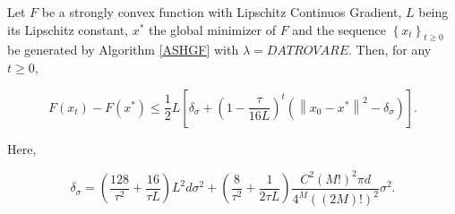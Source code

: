 \begin{thm}\label{DescentBoundThm}

Let $ F $ be a strongly convex function with Lipschitz Continuos Gradient, $L$ being its Lipschitz constant, $x^*$ the global minimizer of $ F $ and the sequence $ \left\{x_{t}\right\}_{t \geq 0} $ be generated by Algorithm \ref{ASHGF} with $ \lambda=DATROVARE $. Then, for any $ t \geq 0 $,

\begin{equation}\label{DescentBoundEq}
F\left(x_{t}\right)-F\left(x^{*}\right) \leq \frac{1}{2} L\left[\delta_{\sigma}+\left(1-\frac{\tau}{16 L}\right)^{t}\left(\left\|x_{0}-x^{*}\right\|^{2}-\delta_{\sigma}\right)\right] .
\end{equation}

Here,

\begin{equation}\label{DescentBoundThmThings}
\delta_{\sigma}=\left(\frac{128}{\tau^{2}}+\frac{16}{\tau L}\right) L^{2} d \sigma^{2}+\left(\frac{8}{\tau^{2}}+\frac{1}{2 \tau L}\right) \frac{C^{2}(M !)^{2} \pi d}{4^{M}((2 M) !)^{2}} \sigma^{2} .
\end{equation}

\end{thm}

